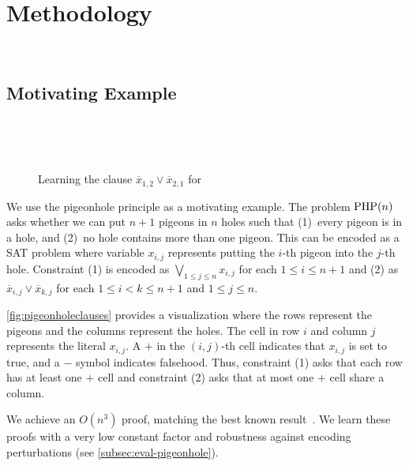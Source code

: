 \section{Methodology}~\label{sec:method}

\subsection{Motivating Example}~\label{sec:motivatex}

\begin{figure*}[!t]
    \centering
    
    \caption{Learning the clause $\overline{x}_{1, 2} \lor \overline{x}_{2, 1}$ for }~\label{fig:pigeonholeclauses}
  \end{figure*}

We use the pigeonhole principle as a motivating example.
The problem $\mathrm{PHP}(n)$ asks whether we can put $n+1$ pigeons in $n$ holes such
that (1)~every pigeon is in a hole, and (2)~no hole contains more than one
pigeon. This can be encoded as a SAT problem where variable $x_{i, j}$
represents putting the $i$-th pigeon into the $j$-th hole. Constraint (1)
is encoded as $\bigvee_{1 \leq j \leq n} x_{i, j}$ for each $1 \leq i \leq n+1$ and
(2) as $\overline{x}_{i, j} \lor \overline{x}_{k, j}$ for each $ 1
\leq i < k \leq n+1$ and $1 \leq j \leq n$.

\autoref{fig:pigeonholeclauses} provides a visualization where the
rows represent the pigeons and the columns represent the holes. The cell in row
$i$ and column $j$ represents the literal $x_{i, j}$.
A $+$ in the $(i, j)$-th cell indicates that $x_{i, j}$ is set to
true, and a $-$ symbol indicates falsehood.
Thus, constraint (1) asks that each row has at least one $+$ cell and
constraint (2) asks that at most one $+$ cell share a column.

We achieve an $O(n^3)$ \pr proof, matching the best known
result~\cite{prclauses}. We learn these proofs with a very low constant
factor and robustness against encoding perturbations (see \autoref{subsec:eval-pigeonhole}).


